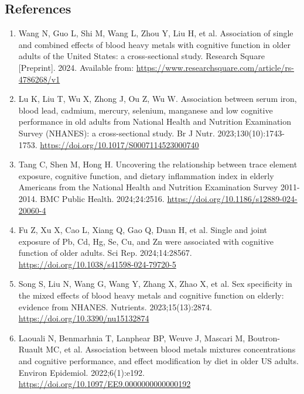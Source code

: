 \documentclass[12pt]{article}
\begin{document}
\clearpage
\begin{singlespace}
\section*{References}

\begin{enumerate}
\item Wang N, Guo L, Shi M, Wang L, Zhou Y, Liu H, et al. Association of single and combined effects of blood heavy metals with cognitive function in older adults of the United States: a cross-sectional study. Research Square [Preprint]. 2024. Available from: \url{https://www.researchsquare.com/article/rs-4786268/v1}

\item Lu K, Liu T, Wu X, Zhong J, Ou Z, Wu W. Association between serum iron, blood lead, cadmium, mercury, selenium, manganese and low cognitive performance in old adults from National Health and Nutrition Examination Survey (NHANES): a cross-sectional study. Br J Nutr. 2023;130(10):1743-1753. \url{https://doi.org/10.1017/S0007114523000740}

\item Tang C, Shen M, Hong H. Uncovering the relationship between trace element exposure, cognitive function, and dietary inflammation index in elderly Americans from the National Health and Nutrition Examination Survey 2011-2014. BMC Public Health. 2024;24:2516. \url{https://doi.org/10.1186/s12889-024-20060-4}

\item Fu Z, Xu X, Cao L, Xiang Q, Gao Q, Duan H, et al. Single and joint exposure of Pb, Cd, Hg, Se, Cu, and Zn were associated with cognitive function of older adults. Sci Rep. 2024;14:28567. \url{https://doi.org/10.1038/s41598-024-79720-5}

\item Song S, Liu N, Wang G, Wang Y, Zhang X, Zhao X, et al. Sex specificity in the mixed effects of blood heavy metals and cognitive function on elderly: evidence from NHANES. Nutrients. 2023;15(13):2874. \url{https://doi.org/10.3390/nu15132874}

\item Laouali N, Benmarhnia T, Lanphear BP, Weuve J, Mascari M, Boutron-Ruault MC, et al. Association between blood metals mixtures concentrations and cognitive performance, and effect modification by diet in older US adults. Environ Epidemiol. 2022;6(1):e192. \url{https://doi.org/10.1097/EE9.0000000000000192}


\end{enumerate}
\end{singlespace}
\end{document}
